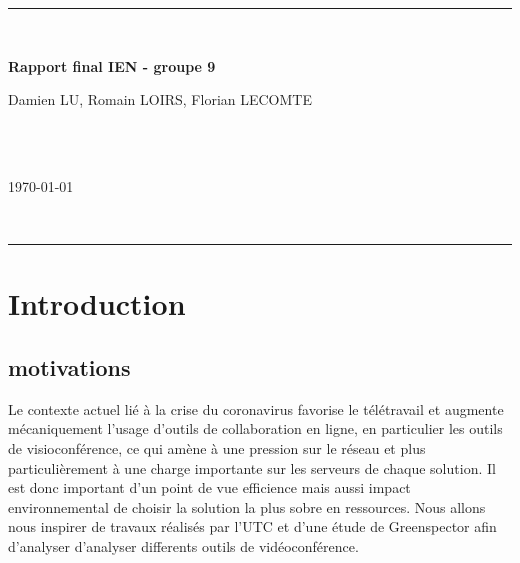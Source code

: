\documentclass[11pt,a4paper]{report}
\begin{document}
\begin{titlepage}
\vspace*{\fill}
\hrule ~\vspace{0.5cm}

\begin{huge}
\noindent \textbf{Rapport final IEN - groupe 9}
\end{huge} 
\vspace{0.5cm}

\vspace{2cm}

\begin{Large}
\noindent Damien LU, Romain LOIRS, Florian LECOMTE
\end{Large} \\ \\
\begin{Large}
\today
\end{Large}
~\vspace{0.5cm}
\hrule
\vspace*{\fill}
\end{titlepage}

\tableofcontents

\newpage
\chapter*{Introduction}

\section{motivations}
Le contexte actuel lié à la crise du coronavirus favorise le télétravail et augmente mécaniquement l’usage d’outils de collaboration en ligne, en particulier les outils de visioconférence, ce qui amène à une pression sur le réseau et plus particulièrement à une charge importante sur les serveurs de chaque solution. Il est donc important d’un point de vue efficience mais aussi impact environnemental de choisir la solution la plus sobre en ressources. Nous allons nous inspirer de travaux réalisés par l'UTC et d'une étude de Greenspector afin d'analyser d'analyser differents outils de vidéoconférence.
\end{document}
